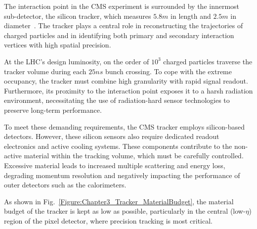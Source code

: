 The interaction point in the CMS experiment is surrounded by the innermost sub-detector, the silicon tracker, which measures $5.8\unit{m}$ in length and $2.5\unit{m}$ in diameter~\cite{LHC_CMS,CMS_Detector_Run3}. The tracker plays a central role in reconstructing the trajectories of charged particles and in identifying both primary and secondary interaction vertices with high spatial precision.

At the LHC’s design luminosity, on the order of $10^3$ charged particles traverse the tracker volume during each $25\unit{ns}$ bunch crossing. To cope with the extreme occupancy, the tracker must combine high granularity with rapid signal readout. Furthermore, its proximity to the interaction point exposes it to a harsh radiation environment, necessitating the use of radiation-hard sensor technologies to preserve long-term performance.

To meet these demanding requirements, the CMS tracker employs silicon-based detectors. However, these silicon sensors also require dedicated readout electronics and active cooling systems. These components contribute to the non-active material within the tracking volume, which must be carefully controlled. Excessive material leads to increased multiple scattering and energy loss, degrading momentum resolution and negatively impacting the performance of outer detectors such as the calorimeters.

As shown in Fig.~\ref{Figure:Chapter3_Tracker_MaterialBudget}, the material budget of the tracker is kept as low as possible, particularly in the central (low-$\eta$) region of the pixel detector, where precision tracking is most critical.


